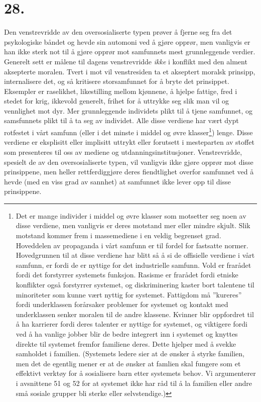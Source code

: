 \documentclass[oneside]{book}
\begin{document}
\section*{28.}
Den venstrevridde av den oversosialiserte typen prøver å fjerne seg fra det psykologiske båndet og hevde sin automoni ved å gjøre opprør, men vanligvis er han ikke sterk not til å gjøre opprør mot samfunnets mest grunnleggende verdier. Generelt sett er målene til dagens venstrevridde {\em ikke} i konflikt med den alment aksepterte moralen. Tvert i mot vil venstresiden ta et akseptert moralsk prinsipp, internalisere det, og så kritisere storsamfunnet for å bryte det prinsippet. Eksempler er raselikhet, likestilling mellom kjønnene, å hjelpe fattige, fred i stedet for krig, ikkevold generelt, frihet for å uttrykke seg slik man vil og vennlighet mot dyr. Mer grunnleggende individets plikt til å tjene samfunnet, og samsfunnets plikt til å ta seg av individet. Alle disse verdiene har vært dypt rotfestet i vårt samfunn (eller i det minste i middel og øvre klasser\footnote{Det er mange individer i middel og øvre klasser som motsetter seg noen av disse verdiene, men vanligvis er deres motstand mer eller mindre skjult. Slik motstand kommer frem i massemediene i en veldig begrenset grad. Hoveddelen av propaganda i vårt samfunn er til fordel for fastsatte normer. Hovedgrunnen til at disse verdiene har blitt så å si de offisielle verdiene i vårt samfunn, er fordi de er nyttige for det industrielle samfunn. Vold er frarådet fordi det forstyrrer systemets funksjon. Rasisme er frarådet fordi etniske konflikter også forstyrrer systemet, og diskriminering kaster bort talentene til minoriteter som kunne vært nyttig for systemet. Fattigdom må ''kureres'' fordi underklassen forårsaker problemer for systemet og kontakt med underklassen senker moralen til de andre klassene. Kvinner blir oppfordret til å ha karrierer fordi deres talenter er nyttige for systemet, og viktigere fordi ved å ha vanlige jobber blir de bedre integrert inn i systemet og knyttes direkte til systemet fremfor familiene deres. Dette hjelper med å svekke samholdet i familien. (Systemets ledere sier at de ønsker å styrke familien, men det de egentlig mener er at de ønsker at famlien skal fungere som et effektivt verktøy for å sosialisere barn etter systemets behov. Vi argumenterer i avsnittene 51 og 52 for at systemet ikke har råd til å la familien eller andre små sosiale grupper bli sterke eller selvstendige.)}) lenge. Disse verdiene er eksplisitt eller implisitt uttrykt eller forutsett i mesteparten av stoffet som presenteres til oss av mediene og utdanningsinstitusjoner. Venstrevridde, spesielt de av den oversosialiserte typen, vil vanligvis ikke gjøre opprør mot disse prinsippene, men heller rettferdiggjøre deres fiendtlighet overfor samfunnet ved å hevde (med en viss grad av sannhet) at samfunnet ikke lever opp til disse prinsippene.
\end{document}
